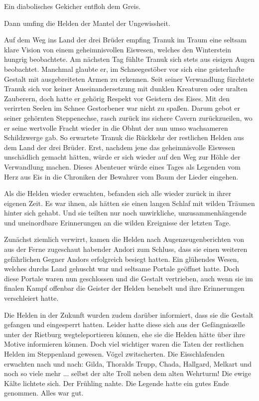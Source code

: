 Ein diabolisches Gekicher entfloh dem Greis.

Dann umfing die Helden der Mantel der Ungewissheit.


Auf dem Weg ins Land der drei Brüder empfing Tranuk im Traum eine seltsam klare Vision von einem geheimnisvollen Eiswesen, welches den Winterstein hungrig beobachtete. Am nächsten Tag fühlte Tranuk sich stets aus eisigen Augen beobachtet. Manchmal glaubte er, im Schneegestöber vor sich eine geisterhafte Gestalt mit ausgebreiteten Armen zu erkennen. Seit seiner Verwandlung fürchtete Tranuk sich vor keiner Auseinandersetzung mit dunklen Kreaturen oder uralten Zauberern, doch hatte er gehörig Respekt vor Geistern des Eises. Mit den verirrten Seelen im Schnee Gestorbener war nicht zu spaßen. Darum gebot er seiner gehörnten Steppenechse, rasch zurück ins sichere Cavern zurückzueilen, wo er seine wertvolle Fracht wieder in die Obhut der nun umso wachsameren Schildzwerge gab. So erwartete Tranuk die Rückkehr der restlichen Helden aus dem Land der drei Brüder. Erst, nachdem jene das geheimnisvolle Eiswesen unschädlich gemacht hätten, würde er sich wieder auf den Weg zur Höhle der Verwandlung machen. Dieses Abenteuer würde eines Tages als Legenden vom Herz aus Eis in die Chroniken der Bewahrer vom Baum der Lieder eingehen.



\trennzeichen



Als die Helden wieder erwachten, befanden sich alle wieder zurück in ihrer eigenen Zeit. Es war ihnen, als hätten sie einen langen Schlaf mit wilden Träumen hinter sich gehabt. Und sie teilten nur noch unwirkliche, unzusammenhängende und uneinordbare Erinnerungen an die wilden Ereignisse der letzten Tage. 

Zunächst ziemlich verwirrt, kamen die Helden nach Augenzeugenberichten von aus der Ferne zugeschaut habender Andori zum Schluss, dass sie einen weiteren gefährlichen Gegner Andors erfolgreich besiegt hatten. Ein glühendes Wesen, welches durchs Land gehuscht war und seltsame Portale geöffnet hatte. Doch diese Portale waren nun geschlossen und die Gestalt vertrieben, auch wenn sie im finalen Kampf offenbar die Geister der Helden benebelt und ihre Erinnerungen verschleiert hatte. 

Die Helden in der Zukunft wurden zudem darüber informiert, dass sie die Gestalt gefangen und eingesperrt hatten. Leider hatte diese sich aus der Gefängniszelle unter der Rietburg wegteleportieren können, ehe sie die Helden hätte über ihre Motive informieren können. Doch viel wichtiger waren die Taten der restlichen Helden im Steppenland gewesen. Vögel zwitscherten. Die Eisschlafenden erwachten nach und nach: Gilda, Thoralds Trupp, Chada, Hallgard, Melkart und noch so viele mehr ... selbst der alte Troll neben dem alten Wehrturm! Die ewige Kälte lichtete sich. Der Frühling nahte. Die Legende hatte ein gutes Ende genommen. Alles war gut. 

